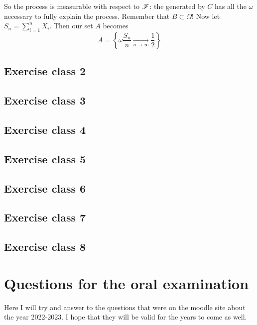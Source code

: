 \documentclass{report}
\begin{document}
So the process is measurable with respect to $\mathscr{F}$: the \sa{} generated by $C$ has all the $\omega$ necessary to fully explain the process. Remember that $B\subset\Omega$! Now let $S_n=\sum_{i=1}^{n}X_i$. Then our set $A$ becomes
\begin{equation*}
	A=\left\{\omega\frac{S_n}{n}\xrightarrow[n\to\infty]{}\frac{1}{2}\right\}
\end{equation*}
\subsection{Exercise class 2}
\subsection{Exercise class 3}
\subsection{Exercise class 4}
\subsection{Exercise class 5}
\subsection{Exercise class 6}
\subsection{Exercise class 7}
\subsection{Exercise class 8}
\section{Questions for the oral examination}
Here I will try and answer to the questions that were on the moodle site about the year 2022-2023. I hope that they will be valid for the years to come as well.
\end{document}
